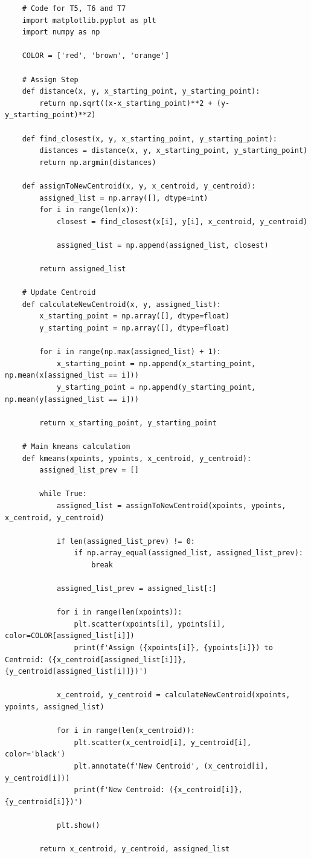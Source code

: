 \documentclass[12pt, a4paper]{article}
\begin{document}
\begin{lstlisting}
    # Code for T5, T6 and T7
    import matplotlib.pyplot as plt
    import numpy as np

    COLOR = ['red', 'brown', 'orange']

    # Assign Step
    def distance(x, y, x_starting_point, y_starting_point):
        return np.sqrt((x-x_starting_point)**2 + (y-y_starting_point)**2)
    
    def find_closest(x, y, x_starting_point, y_starting_point):
        distances = distance(x, y, x_starting_point, y_starting_point)
        return np.argmin(distances)
    
    def assignToNewCentroid(x, y, x_centroid, y_centroid):
        assigned_list = np.array([], dtype=int)
        for i in range(len(x)):
            closest = find_closest(x[i], y[i], x_centroid, y_centroid)
    
            assigned_list = np.append(assigned_list, closest)
    
        return assigned_list
    
    # Update Centroid
    def calculateNewCentroid(x, y, assigned_list):
        x_starting_point = np.array([], dtype=float)
        y_starting_point = np.array([], dtype=float)
    
        for i in range(np.max(assigned_list) + 1):
            x_starting_point = np.append(x_starting_point, np.mean(x[assigned_list == i]))
            y_starting_point = np.append(y_starting_point, np.mean(y[assigned_list == i]))
    
        return x_starting_point, y_starting_point

    # Main kmeans calculation
    def kmeans(xpoints, ypoints, x_centroid, y_centroid):
        assigned_list_prev = []

        while True:
            assigned_list = assignToNewCentroid(xpoints, ypoints, x_centroid, y_centroid)

            if len(assigned_list_prev) != 0:
                if np.array_equal(assigned_list, assigned_list_prev):
                    break

            assigned_list_prev = assigned_list[:]

            for i in range(len(xpoints)):
                plt.scatter(xpoints[i], ypoints[i], color=COLOR[assigned_list[i]])
                print(f'Assign ({xpoints[i]}, {ypoints[i]}) to Centroid: ({x_centroid[assigned_list[i]]}, {y_centroid[assigned_list[i]]})')
            
            x_centroid, y_centroid = calculateNewCentroid(xpoints, ypoints, assigned_list)

            for i in range(len(x_centroid)):
                plt.scatter(x_centroid[i], y_centroid[i], color='black')
                plt.annotate(f'New Centroid', (x_centroid[i], y_centroid[i]))
                print(f'New Centroid: ({x_centroid[i]}, {y_centroid[i]})')
            
            plt.show()
        
        return x_centroid, y_centroid, assigned_list
\end{lstlisting}
\end{document}
